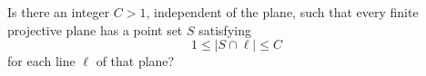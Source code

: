 Is there an integer $C>1$, independent of the plane, such that every finite projective plane has a point set $S$ satisfying
\[
1\leq |S\cap\ell|\leq C
\]
for each line $\ell$ of that plane?
